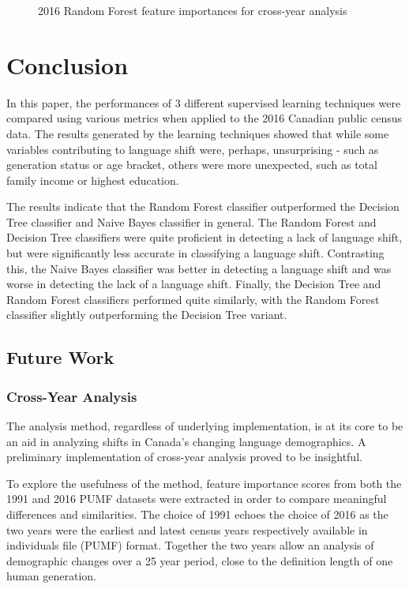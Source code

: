\documentclass[10pt, conference, compsocconf]{IEEEtran}
\begin{document}
{\begin{figure}[!p]
{\begin{tabular}{llll}
  \end{tabular}}
  \caption{2016 Random Forest feature importances for cross-year analysis}
  \label{fig:2016_random_forest_importances}
\end{figure}
\clearpage
}

\section{Conclusion}

In this paper, the performances of 3 different supervised learning techniques were compared using various metrics when applied to the 2016 Canadian public census data. The results generated by the learning techniques showed that while some variables contributing to language shift were, perhaps, unsurprising - such as generation status or age bracket, others were more unexpected, such as total family income or highest education.

The results indicate that the Random Forest classifier outperformed the Decision Tree classifier and Naive Bayes classifier in general. The Random Forest and Decision Tree classifiers were quite proficient in detecting a lack of language shift, but were significantly less accurate in classifying a language shift. Contrasting this, the Naive Bayes classifier was better in detecting a language shift and was worse in detecting the lack of a language shift. Finally, the Decision Tree and Random Forest classifiers performed quite similarly, with the Random Forest classifier slightly outperforming the Decision Tree variant.


\subsection{Future Work}

\subsubsection{Cross-Year Analysis}

The analysis method, regardless of underlying implementation, is at its core to be an aid in analyzing shifts in Canada's changing language demographics.  A preliminary implementation of cross-year analysis proved to be insightful.

To explore the usefulness of the method, feature importance scores from both the 1991 and 2016 PUMF datasets were extracted in order to compare meaningful differences and similarities.  The choice of 1991 echoes the choice of 2016 as the two years were the earliest and latest census years respectively available in individuals file (PUMF) format.  Together the two years allow an analysis of demographic changes over a 25 year period, close to the definition length of one human generation.  \cite{generation1}
\end{document}
